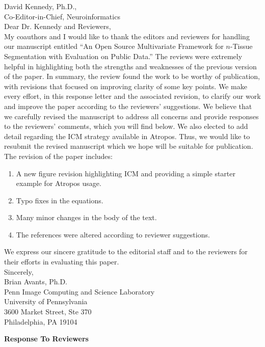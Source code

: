 \documentclass[11pt]{article}
\begin{document}
\noindent
David Kennedy, Ph.D.,\\
Co-Editor-in-Chief, Neuroinformatics\\

\noindent
Dear Dr. Kennedy and Reviewers,\\

\noindent
My coauthors and I would like to thank the editors and reviewers for
handling our manuscript entitled ``An Open Source Multivariate Framework for $n$-Tissue
  Segmentation with Evaluation on Public Data.''  The reviews were extremely helpful in highlighting both
the strengths and weaknesses of the previous version of the paper.  In
summary, the review found the work to be worthy of publication, with
revisions that focused on improving clarity of some key points. We make every effort, in this response letter and the
associated revision, to clarify our work and improve the paper
according to the reviewers' suggestions. We believe that we carefully
revised the manuscript to address all concerns and provide responses
to the reviewers' comments, which you will find below.   We
also elected to add detail regarding the ICM strategy
available in Atropos. Thus, we would
like to resubmit the revised manuscript which we hope will be suitable
for publication. \\

\noindent
The revision of the paper includes:
\begin{enumerate}
\item  A new figure revision highlighting ICM and providing a simple
  starter example for Atropos usage. 
\item Typo fixes in the equations. 
\item  Many minor changes in the body of the text.  
\item  The references were altered according to reviewer suggestions.
\end{enumerate}
We express our sincere gratitude to
the editorial staff and to the reviewers for their efforts in
evaluating this paper. \\

\noindent
Sincerely,\\

\noindent
Brian Avants, Ph.D.\\
Penn Image Computing and Science Laboratory \\ 
University of Pennsylvania\\
3600 Market Street, Ste 370\\
Philadelphia, PA 19104
\newpage
\begin{center}
\LARGE{{\bf Response To Reviewers}}
\end{center}
\end{document}
